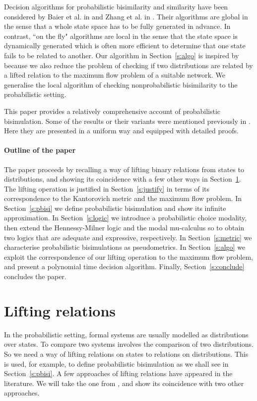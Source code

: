 \documentclass{article}
\begin{document}
Decision algorithms for probabilistic bisimilarity and similarity
have been considered by Baier et al. in \cite{BEM00} and Zhang et
al. in \cite{ZHEJ08}. Their algorithms are global in the sense that
a whole state space has to be fully generated in advance. In
contrast, ``on the fly" algorithms are local in the sense that the
state space is dynamically generated which is often more efficient
to determine that one state fails to be related to another. Our
algorithm in Section~\ref{s:algo} is inspired by \cite{BEM00}
because we also reduce the problem of checking if two distributions
are related by a lifted relation to the maximum flow problem of a
suitable network. We generalise the local algorithm of checking
nonprobabilistic bisimilarity \cite{FM90,Lin98} to the probabilistic
setting.

This paper provides a relatively comprehensive account of
probabilistic bisimulation. Some of the results or their variants were mentioned previously 
in \cite{DCPP05,DD09,DD09b,DG10}. Here they are presented in a uniform
way and equipped with detailed proofs.


\paragraph{Outline of the paper} The paper proceeds by recalling a
way of lifting binary relations from states to distributions, and
showing its coincidence with a few other ways in
Section~\ref{s:lift}. The lifting operation is justified in
Section~\ref{s:justify} in terms of its correspondence to the
Kantorovich metric and the maximum flow problem. In
Section~\ref{s:pbisi} we define probabilistic bisimulation and show
its infinite approximation. In Section~\ref{s:logic} we introduce a
probabilistic choice modality, then extend the Hennessy-Milner logic
and the modal mu-calculus so to obtain two logics that are adequate
and expressive, respectively. In Section~\ref{s:metric} we
characterise probabilistic bisimulations as pseudometrics. In
Section~\ref{s:algo} we exploit the correspondence of our lifting
operation to the maximum flow problem, and present a polynomial time
decision algorithm. Finally, Section~\ref{s:conclude} concludes the
paper.


\section{Lifting relations}\label{s:lift}
In the probabilistic setting, formal systems are usually modelled as
distributions over states. To compare two systems involves the
comparison of two distributions. So we need a way of lifting
relations on states to relations on distributions. This is used, for
example, to define probabilistic bisimulation as we shall see in
Section~\ref{s:pbisi}. A few approaches of lifting relations have
appeared in the literature. We will take the one from \cite{DGHM09},
and show its coincidence with two other approaches.
\end{document}
